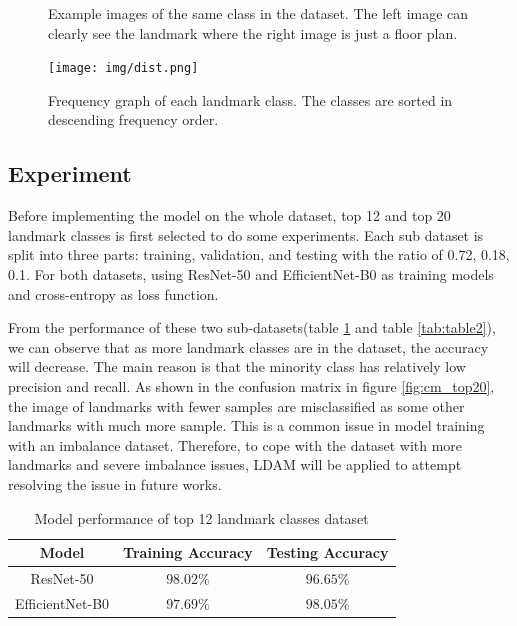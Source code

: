 \documentclass[10pt,twocolumn,letterpaper]{article}
\begin{document}
\begin{figure}[!htb]

    \caption{Example images of the same class in the dataset. The left image can clearly see the landmark where the right image is just a floor plan.}
    \label{fig:landmark_example}
\end{figure}

\begin{figure}
    \centering
    \texttt{[image: img/dist.png]}
    \caption{Frequency graph of each landmark class. The classes are sorted in descending frequency order.}
    \label{fig:dist_data}
\end{figure}

\subsection{Experiment}
Before implementing the model on the whole dataset, top 12 and top 20 landmark classes is first selected to do some experiments. Each sub dataset is split into three parts: training, validation, and testing with the ratio of 0.72, 0.18, 0.1. For both datasets, using ResNet-50 and EfficientNet-B0 as training models and cross-entropy as loss function.

From the performance of these two sub-datasets(table \ref{tab:table1} and table \ref{tab:table2}), we can observe that as more landmark classes are in the dataset, the accuracy will decrease. The main reason is that the minority class has relatively low precision and recall. As shown in the confusion matrix in figure \ref{fig:cm_top20}, the image of landmarks with fewer samples are misclassified as some other landmarks with much more sample. This is a common issue in model training with an imbalance dataset. Therefore, to cope with the dataset with more landmarks and severe imbalance issues, LDAM will be applied to attempt resolving the issue in future works.

\begin{table}[]
    \centering
    \begin{tabular}{c c c}
        \hline Model & Training Accuracy & Testing Accuracy \\ \hline
        ResNet-50 & $98.02\%$ & $96.65\%$ \\
        EfficientNet-B0 & $97.69\%$ & $98.05\%$ \\ \hline
    \end{tabular}
    \vspace{5pt}
    \caption{Model performance of top 12 landmark classes dataset}
    \label{tab:table1}
\end{table}
\end{document}
